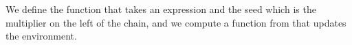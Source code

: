 We define the function  that takes an expression  and the seed
which is the multiplier on the left of the chain, and we compute a function
from that updates the environment.
\begin{code}%
%
\>[2]\AgdaSpace{}%
\AgdaSymbol{:}\AgdaSpace{}%
\AgdaSpace{}%
\AgdaSpace{}%
\AgdaSpace{}%
\AgdaSpace{}%
\AgdaSymbol{(}\AgdaSpace{}%
\AgdaSymbol{:}\AgdaSpace{}%
\AgdaSpace{}%
\AgdaSpace{}%
\AgdaSymbol{)}\AgdaSpace{}%
\AgdaSpace{}%
\AgdaSpace{}%
\AgdaSpace{}%
\AgdaSpace{}%
\AgdaSpace{}%
\AgdaSpace{}%
\AgdaSpace{}%
\<%
\\
%
\\[\AgdaEmptyExtraSkip]%
%
\>[2]\AgdaSpace{}%
\AgdaSymbol{:}\AgdaSpace{}%
\AgdaSymbol{(}\AgdaSpace{}%
\AgdaSpace{}%
\AgdaSymbol{:}\AgdaSpace{}%
\AgdaSpace{}%
\AgdaSymbol{(}\AgdaSpace{}%
\AgdaSpace{}%
\AgdaSpace{}%
\AgdaSymbol{)}\AgdaSpace{}%
\AgdaSymbol{)}\AgdaSpace{}%
\AgdaSpace{}%
\AgdaSpace{}%
\AgdaSpace{}%
\AgdaSpace{}%
\AgdaSpace{}%
\AgdaSpace{}%
\AgdaSpace{}%
\<%
\\
%
\>[2]\AgdaSpace{}%
\AgdaSymbol{\{}\AgdaSymbol{\}}\AgdaSpace{}%
\AgdaSpace{}%
\AgdaSpace{}%
\AgdaSpace{}%
\AgdaSymbol{=}\AgdaSpace{}%
\AgdaSpace{}%
\AgdaSymbol{\{}\AgdaSymbol{\}}\AgdaSpace{}%
\AgdaSpace{}%
\AgdaSymbol{(}\AgdaSpace{}%
\AgdaSymbol{\{}\AgdaSymbol{\}}\AgdaSpace{}%
\AgdaSpace{}%
\AgdaSymbol{(}\AgdaSpace{}%
\AgdaSpace{}%
\AgdaSpace{}%
\AgdaSymbol{(}\AgdaSpace{}%
\AgdaSymbol{\{}\AgdaSymbol{\})))}\AgdaSpace{}%
\<%
\\
%
\\[\AgdaEmptyExtraSkip]%

\end{code}
